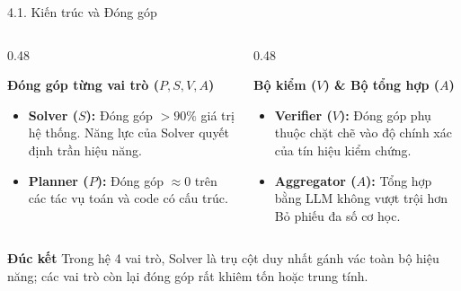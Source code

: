 \documentclass[aspectratio=169,10pt]{beamer}
\begin{document}
\begin{frame}{4.1. Kiến trúc và Đóng góp}
  \begin{columns}[t]
    \begin{column}{0.48\textwidth}
      \begin{block}{\textbf{Đóng góp từng vai trò ($P, S, V, A$)}}
        \begin{itemize}\small
          \item \textbf{Solver ($S$):} Đóng góp $>90\%$ giá trị hệ thống. Năng lực của Solver quyết định trần hiệu năng.
          \item \textbf{Planner ($P$):} Đóng góp $\approx 0$ trên các tác vụ toán và code có cấu trúc.
        \end{itemize}
      \end{block}
    \end{column}
    
    \begin{column}{0.48\textwidth}
      \begin{block}{\textbf{Bộ kiểm ($V$) \& Bộ tổng hợp ($A$)}}
        \begin{itemize}\small
          \item \textbf{Verifier ($V$):} Đóng góp phụ thuộc chặt chẽ vào độ chính xác của tín hiệu kiểm chứng.
          \item \textbf{Aggregator ($A$):} Tổng hợp bằng LLM không vượt trội hơn Bỏ phiếu đa số cơ học.
        \end{itemize}
      \end{block}
    \end{column}
  \end{columns}
  
  \vspace{8pt}
  \begin{alertblock}{\textbf{Đúc kết}}
    \centering\small
    Trong hệ 4 vai trò, Solver là trụ cột duy nhất gánh vác toàn bộ hiệu năng; các vai trò còn lại đóng góp rất khiêm tốn hoặc trung tính.
  \end{alertblock}
\end{frame}
\end{document}
